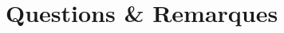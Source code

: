 \documentclass[11pt,a4paper]{article}
\begin{document}









\section{Questions \& Remarques}
\end{document}
